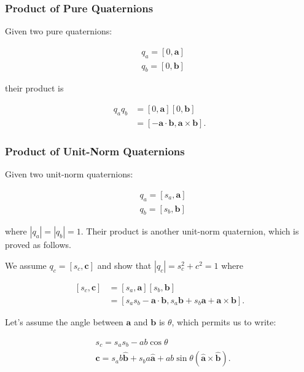 \documentclass[10pt]{article}
\begin{document}
\subsubsection{Product of Pure Quaternions}
Given two pure quaternions:

$$
\begin{aligned}
& q_{a}=[0, \mathbf{a}] \\
& q_{b}=[0, \mathbf{b}]
\end{aligned}
$$

their product is

$$
\begin{aligned}
q_{a} q_{b} & =[0, \mathbf{a}][0, \mathbf{b}] \\
& =[-\mathbf{a} \cdot \mathbf{b}, \mathbf{a} \times \mathbf{b}] .
\end{aligned}
$$

\subsubsection{Product of Unit-Norm Quaternions}
Given two unit-norm quaternions:

$$
\begin{aligned}
& q_{a}=\left[s_{a}, \mathbf{a}\right] \\
& q_{b}=\left[s_{b}, \mathbf{b}\right]
\end{aligned}
$$

where $\left|q_{a}\right|=\left|q_{b}\right|=1$. Their product is another unit-norm quaternion, which is proved as follows.

We assume $q_{c}=\left[s_{c}, \mathbf{c}\right]$ and show that $\left|q_{c}\right|=s_{c}^{2}+c^{2}=1$ where

$$
\begin{aligned}
{\left[s_{c}, \mathbf{c}\right] } & =\left[s_{a}, \mathbf{a}\right]\left[s_{b}, \mathbf{b}\right] \\
& =\left[s_{a} s_{b}-\mathbf{a} \cdot \mathbf{b}, s_{a} \mathbf{b}+s_{b} \mathbf{a}+\mathbf{a} \times \mathbf{b}\right] .
\end{aligned}
$$

Let's assume the angle between $\mathbf{a}$ and $\mathbf{b}$ is $\theta$, which permits us to write:

$$
\begin{aligned}
& s_{c}=s_{a} s_{b}-a b \cos \theta \\
& \mathbf{c}=s_{a} b \hat{\mathbf{b}}+s_{b} a \hat{\mathbf{a}}+a b \sin \theta(\hat{\mathbf{a}} \times \hat{\mathbf{b}}) .
\end{aligned}
$$
\end{document}
